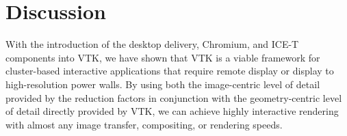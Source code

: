 \documentclass{acmsiggraph}
\newcommand{\sticky}[1]{}
\newcommand{\cidentifier}[1]{\texttt{#1}}
\begin{document}
  \section{Discussion}
  \label{sec:discussion}

  With the introduction of the desktop delivery, Chromium, and ICE-T
  components into VTK, we have shown that VTK is a viable framework for
  cluster-based interactive applications that require remote display or
  display to high-resolution power walls.  By using both the image-centric
  level of detail provided by the reduction factors in conjunction with the
  geometry-centric level of detail directly provided by VTK, we can achieve
  highly interactive rendering with almost any image transfer, compositing,
  or rendering speeds.  \sticky{Some empirical evidence, i.e. with LLNL
  data, would probably be good here.  But how?  You really need a video and
  see it in action.}


\end{document}
